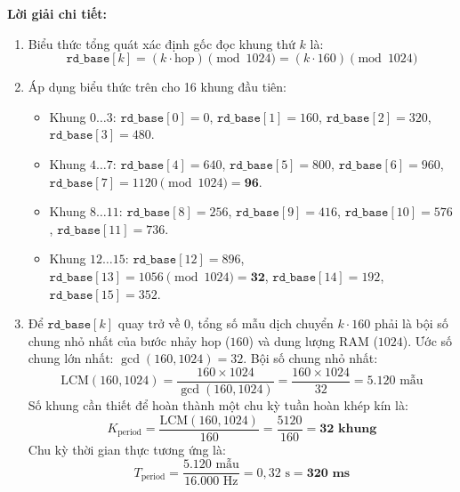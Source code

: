 \textbf{Lời giải chi tiết:}
\begin{enumerate}[label=(\alph*)]
    \item Biểu thức tổng quát xác định gốc đọc khung thứ $k$ là:
    \begin{equation}
    \texttt{rd\_base}[k] = (k \cdot \text{hop}) \pmod{1024} = (k \cdot 160) \pmod{1024}
    \end{equation}
    
    \item Áp dụng biểu thức trên cho 16 khung đầu tiên:
    \begin{itemize}[leftmargin=1.5em, itemsep=1pt]
        \item Khung $0 \dots 3$: $\texttt{rd\_base}[0]=0$, $\texttt{rd\_base}[1]=160$, $\texttt{rd\_base}[2]=320$, $\texttt{rd\_base}[3]=480$.
        \item Khung $4 \dots 7$: $\texttt{rd\_base}[4]=640$, $\texttt{rd\_base}[5]=800$, $\texttt{rd\_base}[6]=960$, $\texttt{rd\_base}[7]=1120 \pmod{1024} = \mathbf{96}$.
        \item Khung $8 \dots 11$: $\texttt{rd\_base}[8]=256$, $\texttt{rd\_base}[9]=416$, $\texttt{rd\_base}[10]=576$, $\texttt{rd\_base}[11]=736$.
        \item Khung $12 \dots 15$: $\texttt{rd\_base}[12]=896$, $\texttt{rd\_base}[13]=1056 \pmod{1024} = \mathbf{32}$, $\texttt{rd\_base}[14]=192$, $\texttt{rd\_base}[15]=352$.
    \end{itemize}
    
    \item Để $\texttt{rd\_base}[k]$ quay trở về 0, tổng số mẫu dịch chuyển $k \cdot 160$ phải là bội số chung nhỏ nhất của bước nhảy hop ($160$) và dung lượng RAM ($1024$).
    Ước số chung lớn nhất: $\gcd(160, 1024) = 32$.
    Bội số chung nhỏ nhất:
    \begin{equation}
    \text{LCM}(160, 1024) = \frac{160 \times 1024}{\gcd(160, 1024)} = \frac{160 \times 1024}{32} = 5.120\text{ mẫu}
    \end{equation}
    Số khung cần thiết để hoàn thành một chu kỳ tuần hoàn khép kín là:
    \begin{equation}
    K_{\text{period}} = \frac{\text{LCM}(160, 1024)}{160} = \frac{5120}{160} = \mathbf{32\text{ khung}}
    \end{equation}
    Chu kỳ thời gian thực tương ứng là:
    \begin{equation}
    T_{\text{period}} = \frac{5.120\text{ mẫu}}{16.000\text{ Hz}} = 0{,}32\text{ s} = \mathbf{320\text{ ms}}
    \end{equation}
\end{enumerate}

